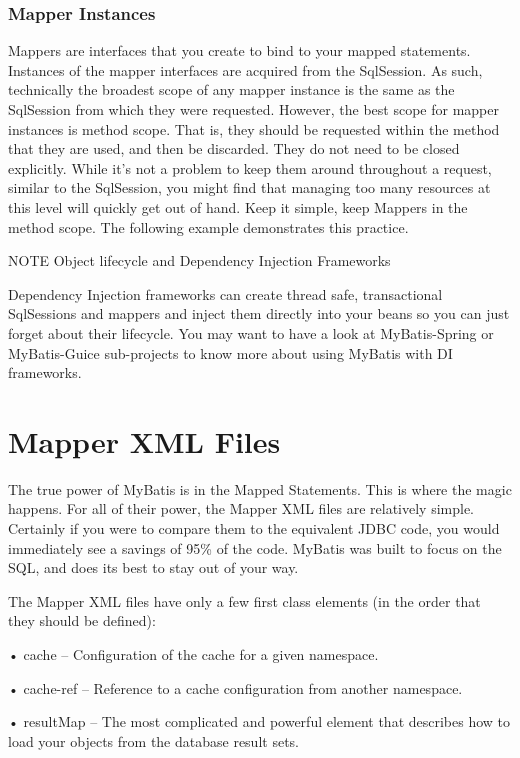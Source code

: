 \subsubsection{Mapper Instances}
Mappers are interfaces that you create to bind to your mapped statements. Instances of the mapper interfaces are acquired from the SqlSession. As such, technically the broadest scope of any mapper instance is the same as the SqlSession from which they were requested. However, the best scope for mapper instances is method scope. That is, they should be requested within the method that they are used, and then be discarded. They do not need to be closed explicitly. While it's not a problem to keep them around throughout a request, similar to the SqlSession, you might find that managing too many resources at this level will quickly get out of hand. Keep it simple, keep Mappers in the method scope. The following example demonstrates this practice.



NOTE Object lifecycle and Dependency Injection Frameworks

Dependency Injection frameworks can create thread safe, transactional SqlSessions and mappers and inject them directly into your beans so you can just forget about their lifecycle. You may want to have a look at MyBatis-Spring or MyBatis-Guice sub-projects to know more about using MyBatis with DI frameworks.

\section{Mapper XML Files}
The true power of MyBatis is in the Mapped Statements. This is where the magic happens. For all of their power, the Mapper XML files are relatively simple. Certainly if you were to compare them to the equivalent JDBC code, you would immediately see a savings of 95\% of the code. MyBatis was built to focus on the SQL, and does its best to stay out of your way.

The Mapper XML files have only a few first class elements (in the order that they should be defined):

•	cache – Configuration of the cache for a given namespace.

•	cache-ref – Reference to a cache configuration from another namespace.

•	resultMap – The most complicated and powerful element that describes how to load your objects from the database result sets.

